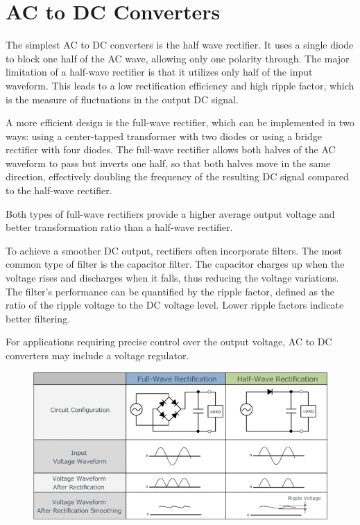 \section{AC to DC Converters}
The simplest AC to DC converters is the half wave rectifier. It uses a single diode to block one half of the AC wave, allowing only one polarity through. The major limitation of a half-wave rectifier is that it utilizes only half of the input waveform. This leads to a low rectification efficiency and high ripple factor, which is the measure of fluctuations in the output DC signal. 

A more efficient design is the full-wave rectifier, which can be implemented in two ways: using a center-tapped transformer with two diodes or using a bridge rectifier with four diodes. The full-wave rectifier allows both halves of the AC waveform to pass but inverts one half, so that both halves move in the same direction, effectively doubling the frequency of the resulting DC signal compared to the half-wave rectifier.

Both types of full-wave rectifiers provide a higher average output voltage and better transformation ratio than a half-wave rectifier. 

To achieve a smoother DC output, rectifiers often incorporate filters. The most common type of filter is the capacitor filter. The capacitor charges up when the voltage rises and discharges when it falls, thus reducing the voltage variations. The filter's performance can be quantified by the ripple factor, defined as the ratio of the ripple voltage to the DC voltage level. Lower ripple factors indicate better filtering.

For applications requiring precise control over the output voltage, AC to DC converters may include a voltage regulator.

\begin{figure}[H]
    \centering
    \includegraphics[scale=0.6]{figs/ch03/half_full_wave.png}
\end{figure}


